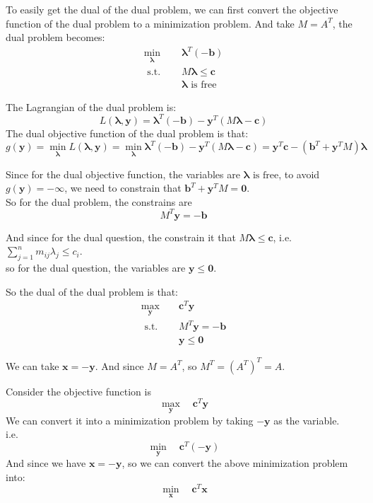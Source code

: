 \documentclass[10pt]{article}
\begin{document}
To easily get the dual of the dual problem, we can first convert the objective function of the dual problem to a minimization problem. And take $M=A^T$,
the dual problem becomes:
\begin{equation}
\begin{aligned}
\min_{\bm{\lambda}} \quad & \bm{\lambda}^T\bm{(-b)} \\
\text { s.t. } \quad & M\bm{\lambda} \leq \bm{c} \\
& \bm{\lambda} \text{ is free}
\end{aligned}
\end{equation}

The Lagrangian of the dual problem is:\\
$$L(\bm{\lambda},\bm{y}) = \bm{\lambda}^T\bm{(-b)} - \bm{y}^T(M\bm{\lambda} - \bm{c})$$
The dual objective function of the dual problem is that:
$$g(\bm{y}) = \min\limits_{\bm{\lambda}} L(\bm{\lambda},\bm{y})=\min\limits_{\bm{\lambda}}\bm{\lambda}^T\bm{(-b)} - \bm{y}^T(M\bm{\lambda} - \bm{c})
=\bm{y}^T\bm{c}-(\bm{b}^T+\bm{y}^TM)\bm{\lambda}$$

Since for the dual objective function, the variables are $\bm{\lambda}\text{ is free}$, to avoid $g(\bm{y})=-\infty$, we need to constrain that $\bm{b}^T+\bm{y}^TM=\bm{0}$.\\
So for the dual problem, the constrains are
$$M^T\bm{y} = \bm{-b}$$

And since for the dual question, the constrain it that $M\bm{\lambda} \leq \bm{c}$, i.e.$\sum\limits_{j=1}^nm_{ij}\lambda_j\leq c_i$.\\
so for the dual question, the variables are $\bm{y}\leq\bm{0}$.

So the dual of the dual problem is that:\\
\begin{equation}
\begin{aligned}
\max_{\bm{y}} \quad & \bm{c}^T\bm{y} \\
\text { s.t. } \quad & M^T\bm{y} = \bm{-b} \\
& \bm{y} \leq \bm{0}
\end{aligned}
\end{equation}

We can take $\bm{x}=-\bm{y}$. And since $M=A^T$, so $M^T=(A^T)^T=A$.

Consider the objective function is 
$$\max\limits_{\bm{y}} \quad \bm{c}^T\bm{y}$$
We can convert it into a minimization problem by taking $-\bm{y}$ as the variable.\\
i.e.
$$\min\limits_{\bm{y}} \quad \bm{c}^T\bm{(-y)}$$
And since we have $\bm{x}=-\bm{y}$, so we can convert the above minimization problem into:
$$\min\limits_{\bm{x}} \quad \bm{c}^T\bm{x}$$
\end{document}
